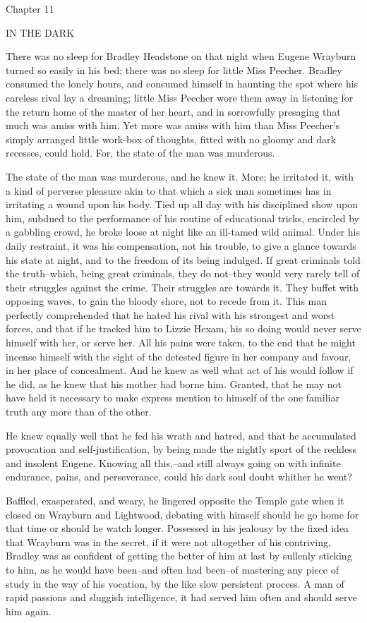 Chapter 11

IN THE DARK


There was no sleep for Bradley Headstone on that night when Eugene
Wrayburn turned so easily in his bed; there was no sleep for little
Miss Peecher. Bradley consumed the lonely hours, and consumed himself in
haunting the spot where his careless rival lay a dreaming; little Miss
Peecher wore them away in listening for the return home of the master
of her heart, and in sorrowfully presaging that much was amiss with him.
Yet more was amiss with him than Miss Peecher’s simply arranged little
work-box of thoughts, fitted with no gloomy and dark recesses, could
hold. For, the state of the man was murderous.

The state of the man was murderous, and he knew it. More; he irritated
it, with a kind of perverse pleasure akin to that which a sick man
sometimes has in irritating a wound upon his body. Tied up all day with
his disciplined show upon him, subdued to the performance of his routine
of educational tricks, encircled by a gabbling crowd, he broke loose at
night like an ill-tamed wild animal. Under his daily restraint, it was
his compensation, not his trouble, to give a glance towards his state at
night, and to the freedom of its being indulged. If great criminals told
the truth--which, being great criminals, they do not--they would very
rarely tell of their struggles against the crime. Their struggles are
towards it. They buffet with opposing waves, to gain the bloody shore,
not to recede from it. This man perfectly comprehended that he hated his
rival with his strongest and worst forces, and that if he tracked him to
Lizzie Hexam, his so doing would never serve himself with her, or serve
her. All his pains were taken, to the end that he might incense himself
with the sight of the detested figure in her company and favour, in her
place of concealment. And he knew as well what act of his would follow
if he did, as he knew that his mother had borne him. Granted, that he
may not have held it necessary to make express mention to himself of the
one familiar truth any more than of the other.

He knew equally well that he fed his wrath and hatred, and that he
accumulated provocation and self-justification, by being made the
nightly sport of the reckless and insolent Eugene. Knowing all
this,--and still always going on with infinite endurance, pains, and
perseverance, could his dark soul doubt whither he went?

Baffled, exasperated, and weary, he lingered opposite the Temple gate
when it closed on Wrayburn and Lightwood, debating with himself should
he go home for that time or should he watch longer. Possessed in his
jealousy by the fixed idea that Wrayburn was in the secret, if it were
not altogether of his contriving, Bradley was as confident of getting
the better of him at last by sullenly sticking to him, as he would have
been--and often had been--of mastering any piece of study in the way
of his vocation, by the like slow persistent process. A man of rapid
passions and sluggish intelligence, it had served him often and should
serve him again.

